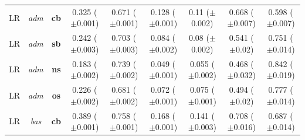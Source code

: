 \documentclass[a4paper,11pt]{article}
\begin{document}
\begin{longtable}[t]{ccccccccc}
\endfoot
\bottomrule
\endlastfoot
LR & \emph{adm} & \textbf{cb} & \shortstack{0.325 \\ ($\pm$0.001)} & \shortstack{0.671 \\ ($\pm$0.001)} & \shortstack{0.128 \\ ($\pm$0.001)} & \shortstack{0.11 \\ ($\pm$0.002)} & \shortstack{0.668 \\ ($\pm$0.007)} & \shortstack{0.598 \\ ($\pm$0.007)}\\
LR & \emph{adm} & \textbf{sb} & \shortstack{0.242 \\ ($\pm$0.003)} & \shortstack{0.703 \\ ($\pm$0.003)} & \shortstack{0.084 \\ ($\pm$0.002)} & \shortstack{0.08 \\ ($\pm$0.002)} & \shortstack{0.541 \\ ($\pm$0.02)} & \shortstack{0.751 \\ ($\pm$0.014)}\\
LR & \emph{adm} & \textbf{ns} & \shortstack{0.183 \\ ($\pm$0.002)} & \shortstack{0.739 \\ ($\pm$0.002)} & \shortstack{0.049 \\ ($\pm$0.001)} & \shortstack{0.055 \\ ($\pm$0.002)} & \shortstack{0.468 \\ ($\pm$0.032)} & \shortstack{0.842 \\ ($\pm$0.019)}\\
LR & \emph{adm} & \textbf{os} & \shortstack{0.226 \\ ($\pm$0.002)} & \shortstack{0.681 \\ ($\pm$0.002)} & \shortstack{0.072 \\ ($\pm$0.001)} & \shortstack{0.075 \\ ($\pm$0.001)} & \shortstack{0.494 \\ ($\pm$0.02)} & \shortstack{0.777 \\ ($\pm$0.014)}\\
\addlinespace
LR & \emph{bas} & \textbf{cb} & \shortstack{0.389 \\ ($\pm$0.001)} & \shortstack{0.758 \\ ($\pm$0.001)} & \shortstack{0.168 \\ ($\pm$0.001)} & \shortstack{0.141 \\ ($\pm$0.003)} & \shortstack{0.708 \\ ($\pm$0.016)} & \shortstack{0.687 \\ ($\pm$0.014)}\\

\end{longtable}
\end{document}

